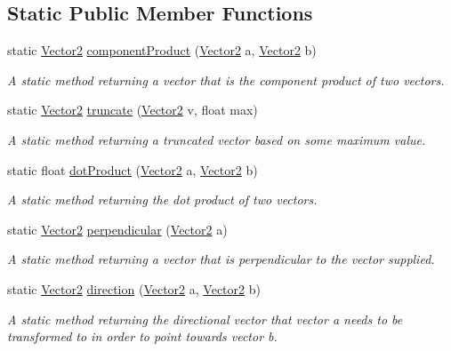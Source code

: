 \subsection*{Static Public Member Functions}
\begin{DoxyCompactItemize}
\item 
static \hyperlink{structsteer_1_1_vector2}{Vector2} \hyperlink{classsteer_1_1_vector_math_a6a637fee6dd4c1fb239d78012e3e5a62}{component\-Product} (\hyperlink{structsteer_1_1_vector2}{Vector2} a, \hyperlink{structsteer_1_1_vector2}{Vector2} b)
\begin{DoxyCompactList}\small\item\em A static method returning a vector that is the component product of two vectors. \end{DoxyCompactList}\item 
static \hyperlink{structsteer_1_1_vector2}{Vector2} \hyperlink{classsteer_1_1_vector_math_ae2a61b5919c0b3e29d98add18340c5e3}{truncate} (\hyperlink{structsteer_1_1_vector2}{Vector2} v, float max)
\begin{DoxyCompactList}\small\item\em A static method returning a truncated vector based on some maximum value. \end{DoxyCompactList}\item 
static float \hyperlink{classsteer_1_1_vector_math_ae9646371fd7dd38c33ee2f88ac114234}{dot\-Product} (\hyperlink{structsteer_1_1_vector2}{Vector2} a, \hyperlink{structsteer_1_1_vector2}{Vector2} b)
\begin{DoxyCompactList}\small\item\em A static method returning the dot product of two vectors. \end{DoxyCompactList}\item 
static \hyperlink{structsteer_1_1_vector2}{Vector2} \hyperlink{classsteer_1_1_vector_math_aa2820b8424b7d01bcbaf877d05108fd2}{perpendicular} (\hyperlink{structsteer_1_1_vector2}{Vector2} a)
\begin{DoxyCompactList}\small\item\em A static method returning a vector that is perpendicular to the vector supplied. \end{DoxyCompactList}\item 
static \hyperlink{structsteer_1_1_vector2}{Vector2} \hyperlink{classsteer_1_1_vector_math_af1e8a61f7eb8fb2ba8fb7fe2fa5d59e9}{direction} (\hyperlink{structsteer_1_1_vector2}{Vector2} a, \hyperlink{structsteer_1_1_vector2}{Vector2} b)
\begin{DoxyCompactList}\small\item\em A static method returning the directional vector that vector a needs to be transformed to in order to point towards vector b. \end{DoxyCompactList}\item 

\end{DoxyCompactItemize}

